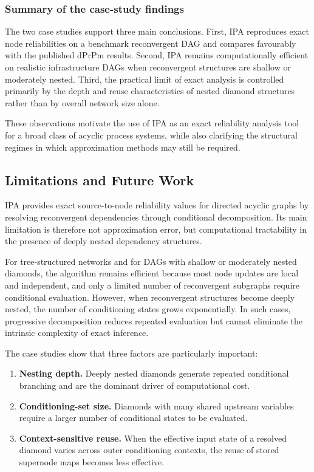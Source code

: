\documentclass[preprint,12pt]{elsarticle}
\begin{document}
\subsubsection{Summary of the case-study findings}

The two case studies support three main conclusions. First, IPA reproduces exact node reliabilities on a benchmark reconvergent DAG and compares favourably with the published dPrPm results. Second, IPA remains computationally efficient on realistic infrastructure DAGs when reconvergent structures are shallow or moderately nested. Third, the practical limit of exact analysis is controlled primarily by the depth and reuse characteristics of nested diamond structures rather than by overall network size alone.

These observations motivate the use of IPA as an exact reliability analysis tool for a broad class of acyclic process systems, while also clarifying the structural regimes in which approximation methods may still be required.


\subsection{Limitations and Future Work}
IPA provides exact source-to-node reliability values for directed acyclic graphs by resolving reconvergent dependencies through conditional decomposition. Its main limitation is therefore not approximation error, but computational tractability in the presence of deeply nested dependency structures.

For tree-structured networks and for DAGs with shallow or moderately nested diamonds, the algorithm remains efficient because most node updates are local and independent, and only a limited number of reconvergent subgraphs require conditional evaluation. However, when reconvergent structures become deeply nested, the number of conditioning states grows exponentially. In such cases, progressive decomposition reduces repeated evaluation but cannot eliminate the intrinsic complexity of exact inference.

The case studies show that three factors are particularly important:
\begin{enumerate}
    \item \textbf{Nesting depth.} Deeply nested diamonds generate repeated conditional branching and are the dominant driver of computational cost.
    \item \textbf{Conditioning-set size.} Diamonds with many shared upstream variables require a larger number of conditional states to be evaluated.
    \item \textbf{Context-sensitive reuse.} When the effective input state of a resolved diamond varies across outer conditioning contexts, the reuse of stored supernode maps becomes less effective.
\end{enumerate}
\end{document}
